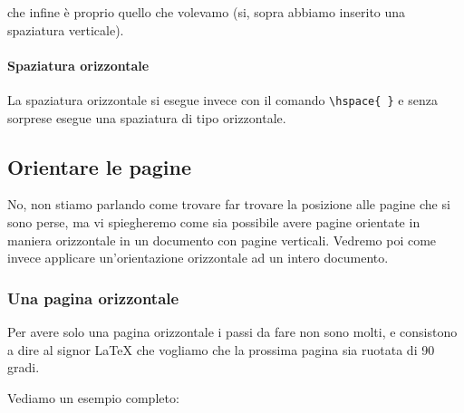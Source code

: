 \vspace{25px}

\noindent che infine è proprio quello che volevamo (si, sopra abbiamo inserito 
una spaziatura verticale).

\paragraph*{Spaziatura orizzontale} La spaziatura orizzontale si esegue invece 
con il comando \verb!\hspace{ }! e senza sorprese esegue una spaziatura di tipo 
orizzontale.

\subsection{Orientare le pagine}

No, non stiamo parlando come trovare far trovare la posizione alle pagine che si 
sono perse, ma vi spiegheremo come sia possibile avere pagine orientate in 
maniera orizzontale in un documento con pagine verticali. Vedremo poi come 
invece applicare un'orientazione orizzontale ad un intero documento.

\subsubsection{Una pagina orizzontale}

Per avere solo una pagina orizzontale i passi da fare non sono molti, e 
consistono a dire al signor \LaTeX{} che vogliamo che la prossima pagina sia 
ruotata di 90 gradi.

\vspace{\abovedisplayskip}
\begin{minipage}{\linewidth}
  \noindent Vediamo un esempio completo:
  
\end{minipage}
\vspace{\belowdisplayskip}
